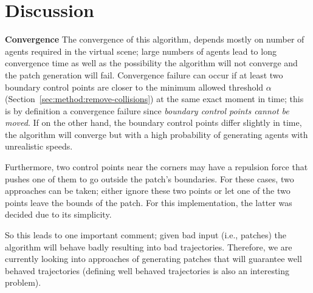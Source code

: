 \section{Discussion}
\label{sec:discussion}

\textbf{Convergence}
The convergence of this algorithm, depends mostly on number of agents required in the virtual scene; large numbers of agents lead to long convergence time as well as the possibility the algorithm will not converge and the patch generation will fail.
Convergence failure can occur if at least two boundary control points are closer to the minimum allowed threshold $\alpha$ (Section~\ref{sec:method:remove-collisions}) at the same exact moment in time; this is by definition a convergence failure since \emph{boundary control points cannot be moved}.
If on the other hand, the boundary control points differ slightly in time, the algorithm will converge but with a high probability of generating agents with unrealistic speeds.

% 

 Furthermore, two control points near the corners may have a repulsion force that pushes one of them to go outside the patch's boundaries.
For these cases, two approaches can be taken; either ignore these two points or let one of the two points leave the bounds of the patch.
 For this implementation, the latter was decided due to its simplicity.
 
 So this leads to one important comment; given bad input (i.e., patches) the algorithm will behave badly resulting into bad trajectories.
 Therefore, we are currently looking into approaches of generating patches that will guarantee well behaved trajectories (defining well behaved trajectories is also an interesting problem).


